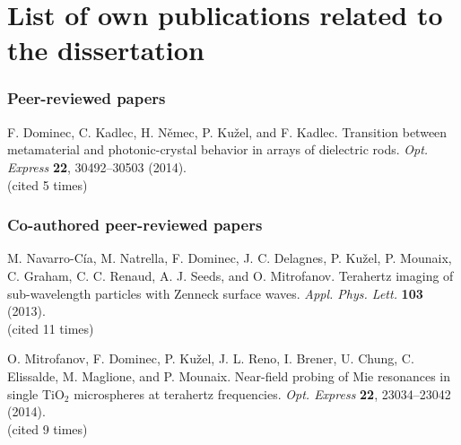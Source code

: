 \documentclass[a4paper,12pt]{report}
\begin{document}
\chapter*{List of own publications related to the dissertation}

\subsection*{Peer-reviewed papers}
F. Dominec, C. Kadlec, H. N\v{e}mec, P. Ku\v{z}el, and F. Kadlec. Transition between metamaterial and photonic-crystal behavior in arrays of dielectric rods. \textit{Opt. Express} \textbf{22}, 30492–30503 (2014).\\
(cited 5 times)




\subsection*{Co-authored peer-reviewed papers}
M. Navarro-C\'{i}a, M. Natrella, F. Dominec, J. C. Delagnes, P. Ku\v{z}el, P. Mounaix, C. Graham, C. C. Renaud, A. J. Seeds, and O. Mitrofanov. 
Terahertz imaging of sub-wavelength particles with Zenneck surface waves. \textit{Appl. Phys. Lett.} \textbf{103} (2013). \\
(cited 11 times)

\vspace{3mm}\noindent 
O. Mitrofanov, F. Dominec, P. Ku\v{z}el, J. L. Reno, I. Brener, U. Chung, C. Elissalde, M. Maglione, and P. Mounaix. 
Near-field probing of Mie resonances in single TiO$_2$ microspheres at terahertz frequencies. \textit{Opt. Express} \textbf{22}, 23034–23042 (2014). \\
(cited 9 times)

\end{document}
